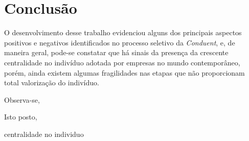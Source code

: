 \documentclass[12pt]{article}
\begin{document}
\section{Conclusão}

O desenvolvimento desse trabalho evidenciou alguns dos principais aspectos positivos e negativos identificados no processo seletivo da \emph{Conduent}, e, de maneira geral, pode-se constatar que há sinais da presença da crescente centralidade no indivíduo adotada por empresas no mundo contemporâneo, porém, ainda existem algumas fragilidades nas etapas que não proporcionam total valorização do indivíduo.

Observa-se, 


Isto posto,


centralidade no individuo 
\end{document}
